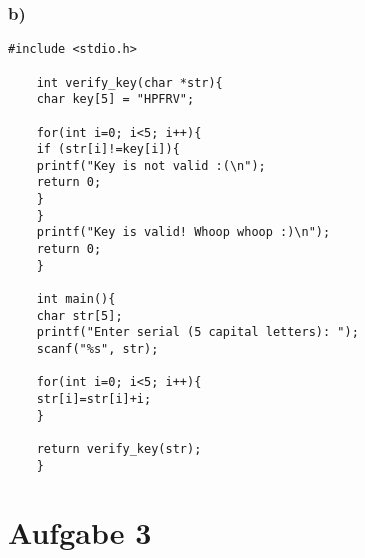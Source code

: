 \documentclass[]{scrreprt}
\begin{document}
	\subsection*{b)}
	\begin{lstlisting}[caption={Crackme-Code},captionpos=b]
	#include <stdio.h>
	
	int verify_key(char *str){
	char key[5] = "HPFRV";
	
	for(int i=0; i<5; i++){
	if (str[i]!=key[i]){
	printf("Key is not valid :(\n");
	return 0;
	}
	}
	printf("Key is valid! Whoop whoop :)\n");
	return 0;
	}
	
	int main(){
	char str[5];
	printf("Enter serial (5 capital letters): ");
	scanf("%s", str);
	
	for(int i=0; i<5; i++){
	str[i]=str[i]+i;
	}
	
	return verify_key(str);
	}
	\end{lstlisting}
	\chapter{Aufgabe 3}
\end{document}
